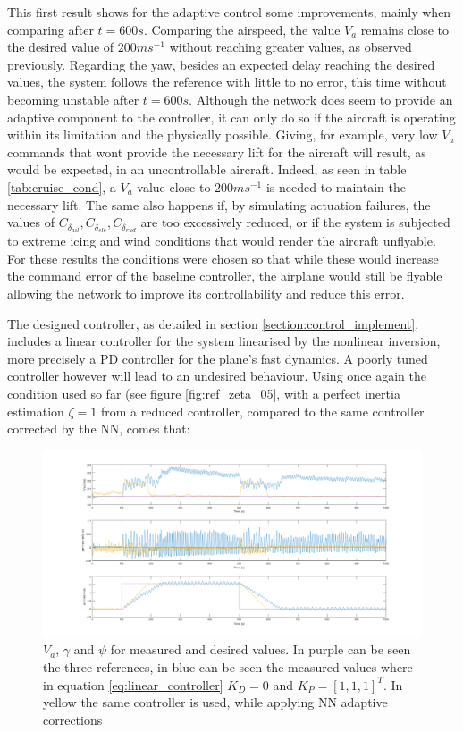 This first result shows for the adaptive control some improvements, mainly when comparing after $t=600s$. Comparing the airspeed, the value $V_a$ remains close to the desired value of $200ms^{-1}$ without reaching greater values, as observed previously. Regarding the yaw, besides an expected delay reaching the desired values, the system follows the reference with little to no error, this time without becoming unstable after $t=600s$. Although the network does seem to provide an adaptive component to the controller, it can only do so if the aircraft is operating within its limitation and the physically possible. Giving, for example, very low $V_a$ commands that wont provide the necessary lift for the aircraft will result, as would be expected, in an uncontrollable aircraft. Indeed, as seen in table \ref{tab:cruise_cond}, a $V_a$ value close to $200ms^{-1}$ is needed to maintain the necessary lift. The same also happens if, by simulating actuation failures, the values of $C_{\delta_{ail}}, C_{\delta_{ele}}, C_{\delta_{rud}}$ are too excessively reduced, or if the system is subjected to extreme icing and wind conditions that would render the aircraft unflyable. For these results the conditions were chosen so that while these would increase the command error of the baseline controller, the airplane would still be flyable allowing the network to improve its controllability and reduce this error.

The designed controller, as detailed in section \ref{section:control_implement}, includes a linear controller for the system linearised by the nonlinear inversion, more precisely a PD controller for the plane's fast dynamics. A poorly tuned controller however will lead to an undesired behaviour. Using once again the condition used so far (see figure \ref{fig:ref_zeta_05}, with a perfect inertia estimation $\zeta = 1$ from a reduced controller, compared to the same controller corrected by the NN, comes that:

\begin{figure}[H]
\centering
\includegraphics[width=1.1\textwidth]{Figures/Results/ref_bad_control.png}
\caption[Poorly tuned controller comparison]{$V_a$, $\gamma$ and $\psi$ for measured and desired values. In purple can be seen the three references, in blue can be seen the measured values where in equation \ref{eq:linear_controller} $K_D=0$ and $K_P = [1,1,1]^T$. In yellow the same controller is used, while applying NN adaptive corrections}
\label{fig:ref_bad_control}
\end{figure}


